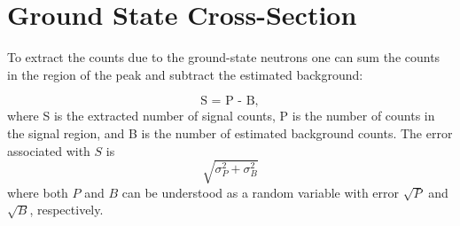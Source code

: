 \section{Ground State Cross-Section}

To extract the counts due to the ground-state neutrons one can sum the counts in the region of the peak and subtract the estimated background:

\begin{equation}
\text{S = P - B},
\label{eq:counts}
\end{equation}
where S is the extracted number of signal counts, P is the number of counts in the signal region, and B is the number of estimated background counts.  The error associated with $S$ is
\begin{equation}
\sqrt{\sigma_{P}^2 + \sigma_{B}^2}
\label{eq:errDef}
\end{equation}
where both $P$ and $B$ can be understood as a random variable with error $\sqrt{P}$ and $\sqrt{B}$, respectively.

